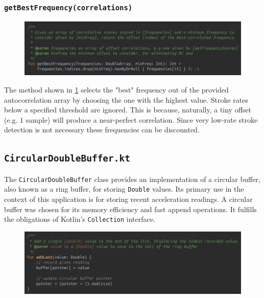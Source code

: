 \documentclass[11pt,twoside,a4paper]{report}
\begin{document}
\subsubsection{\texttt{getBestFrequency(correlations)}}

\begin{figure}[h!]
  \centering
  \includegraphics[width=1.0\textwidth]{code-autocorrelator-getBestFrequency.png}
  \caption{}
  \label{fig:getBestFrequency}
\end{figure}

The method shown in \ref{fig:getBestFrequency} selects the "best" frequency out of the provided autocorrelation array by choosing the one with the highest value. Stroke rates below a specified threshold are ignored. This is because, naturally, a tiny offset (e.g. $1$ sample) will produce a near-perfect correlation. Since very low-rate stroke detection is not necessary these frequencies can be discounted.

\subsection{\texttt{CircularDoubleBuffer.kt}}

The \texttt{CircularDoubleBuffer} class provides an implementation of a circular buffer, also known as a ring buffer, for storing \texttt{Double} values. Its primary use in the context of this application is for storing recent acceleration readings. A circular buffer was chosen for its memory efficiency and fast append operations. It fulfills the obligations of Kotlin's \texttt{Collection} interface.

\begin{figure}[h!]
  \centering
  \includegraphics[width=1.0\textwidth]{code-CircularDoubleBuffer-addLast.png}
  \caption{}
  \label{fig:addLast}
\end{figure}
\end{document}
